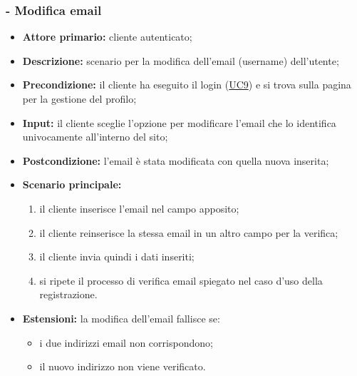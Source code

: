 \subsubsection{ - Modifica email}
\begin{itemize}
    \item \textbf{Attore primario:} cliente autenticato;
    \item \textbf{Descrizione:} scenario per la modifica dell'email (username) dell'utente;
    \item \textbf{Precondizione:} il cliente ha eseguito il login (\hyperref[UC9]{UC9}) e si trova sulla pagina per la gestione del profilo;
    \item \textbf{Input:} il cliente sceglie l'opzione per modificare l'email che lo identifica univocamente all'interno del sito;
    \item \textbf{Postcondizione:} l'email è stata modificata con quella nuova inserita;
    \item \textbf{Scenario principale:}
          \begin{enumerate}
              \item il cliente inserisce l'email nel campo apposito;
              \item il cliente reinserisce la stessa email in un altro campo per la verifica;
              \item il cliente invia quindi i dati inseriti;
              \item si ripete il processo di verifica email spiegato nel caso d'uso della registrazione.
          \end{enumerate}
    \item \textbf{Estensioni:} la modifica dell'email fallisce se:
          \begin{itemize}
              \item i due indirizzi email non corrispondono;
              \item il nuovo indirizzo non viene verificato.
          \end{itemize}
\end{itemize}

\stepsubUserCase
